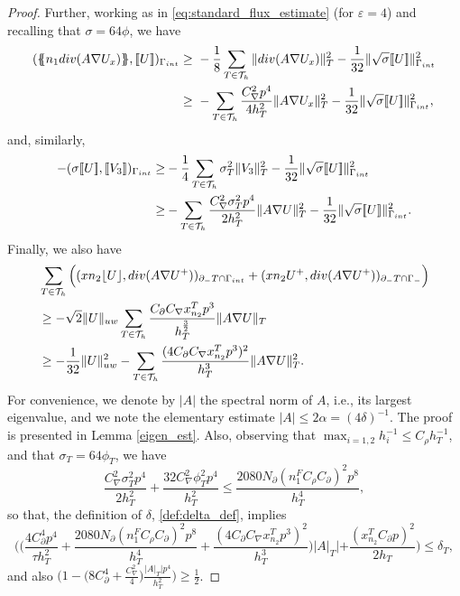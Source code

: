 \documentclass[10pt,a4paper]{amsart}
\newcommand{\Div}{{\rm div}}
\newcommand{\Th}{\mathcal{T}_h}
\newcommand{\av}[1]{\{\kern-1.2mm \{{#1}\}\kern-1.2mm\}}
\newcommand{\avg }[1]{ \av{ #1}}
\newcommand{\cinv}{C_{\nabla}}
\newcommand{\cinvT}{C_{\partial}}
\newcommand{\gif}{\Gamma_-}
\newcommand{\gint}{\Gamma_{\rm int}}
\newcommand{\inner}[3]{({#1},{#2})_{{#3}}}
\newcommand{\jump}[1]{[\kern-0.6mm [{#1}]\kern-0.6mm]}
\newcommand{\jumpu}[1]{ \lfloor #1 \rfloor }
\newcommand{\norm}[2]{\|{#1}\|_{{#2}}}
\newcommand{\normal}{{n}}
\newcommand{\su}{\sum_{T \in \Th}}
\newcommand{\xn}{x_{n_2}^{T}}
\begin{document}
\begin{proof}
Further, working as in \eqref{eq:standard_flux_estimate} (for $\varepsilon=4$) and recalling that $\sigma=64\phi$, we have
	\begin{equation*}\begin{split}
			 \inner{\avg{\normal_1 \Div(A\nabla U_x) }}{\jump{U}}{\gint}
			  \geq&\ -\frac{1}{8}  \su \norm{ \Div(A\nabla U_x) }{ T}^2 -  \frac{1}{32}\norm{\sqrt{\sigma} \jump{U}}{\gint}^2\\
			    \geq&\ -  \su \frac{\cinv^2p^4}{4h_T^2}\norm{ A\nabla U_x }{ T}^2 -  \frac{1}{32}\norm{\sqrt{\sigma} \jump{U}}{\gint}^2,
	\end{split}\end{equation*}
	and, similarly,
	\begin{equation*}\begin{split}
		-	   \inner{\sigma \jump{U}}{\jump{ V_3 }}{\gint }
			\geq& -\frac{1}{4}
			\su  \sigma_T^2\norm{ V_3}{T}^2
			-
			\frac{1}{32}   \norm{\sqrt{\sigma}\jump{U}}{\gint }^2\\
				\geq& -
			\su  \frac{\cinv^2\sigma_T^2p^4}{2h_T^2}\norm{A\nabla U}{T}^2
			-
			\frac{1}{32}   \norm{\sqrt{\sigma}\jump{U}}{\gint }^2.
	\end{split}\end{equation*}
	Finally, we also have
	\begin{equation*}\begin{split}
			&\su \Big( \inner{x\normal_2 \jumpu{U}}{ \Div(A\nabla U^+) }{\partial_- T \cap \gint}
			+
			\inner{x\normal_2 U^+}{ \Div(A\nabla U^+) }{\partial_- T \cap \gif}\Big)
			\\
			&\geq  -\sqrt{2}\norm{U}{\rm uw}
	\su	\frac{	\cinvT\cinv	\xn p^3}{h_T^{\frac{3}{2}}}
			\norm{ A \nabla U }{T}\\
			&
			\geq
			-\frac{1}{32}\norm{U}{\rm uw}^2
			-
			\su\frac{(4\cinvT\cinv	\xn p^3)^2}{h_T^3}
			\norm{ A\nabla U }{T}^2.
	\end{split}\end{equation*}
	For convenience, we denote by $|A|$ the spectral norm of $A$, i.e., its largest eigenvalue, and we note the elementary estimate $|A| \leq 2 \alpha=(4\delta)^{-1}$. The proof is presented in Lemma \ref{eigen_est}. Also, observing that $\max_{i=1,2}h_i^{-1}\le C_{\rho} h_T^{-1}$, and that $\sigma_T=64\phi_T$, we have
	\[
	\frac{\cinv^2\sigma_T^2p^4}{2h_T^2}+  \frac{32\cinv^2\phi_T^2 p^4}{h_T^2}\le \frac{2080N_\partial (n_1^FC_\rho\cinvT)^2p^8}{h_T^4},
	\]
	so that, the definition of $\delta$, \eqref{def:delta_def}, implies
	\[
	\Big( \Big(	   \frac{4\cinvT^4p^4}{\tau h_T^2}+ \frac{2080N_\partial (n_1^FC_\rho\cinvT)^2p^8}{h_T^4}+ \frac{(4\cinvT\cinv	\xn p^3)^2}{h_T^3} \Big)|A|_T| + \frac{(\xn\cinvT p)^2}{2h_T}\Big)\le \delta_T,
	\]
	and also
	$
	\big(1 - \big( 8\cinvT^4+   \frac{\cinv^2}{4} \big) \frac{| A|_T |p^4}{h_T^2}\big) \ge \frac{1}{2}$.



\end{proof}
\end{document}
